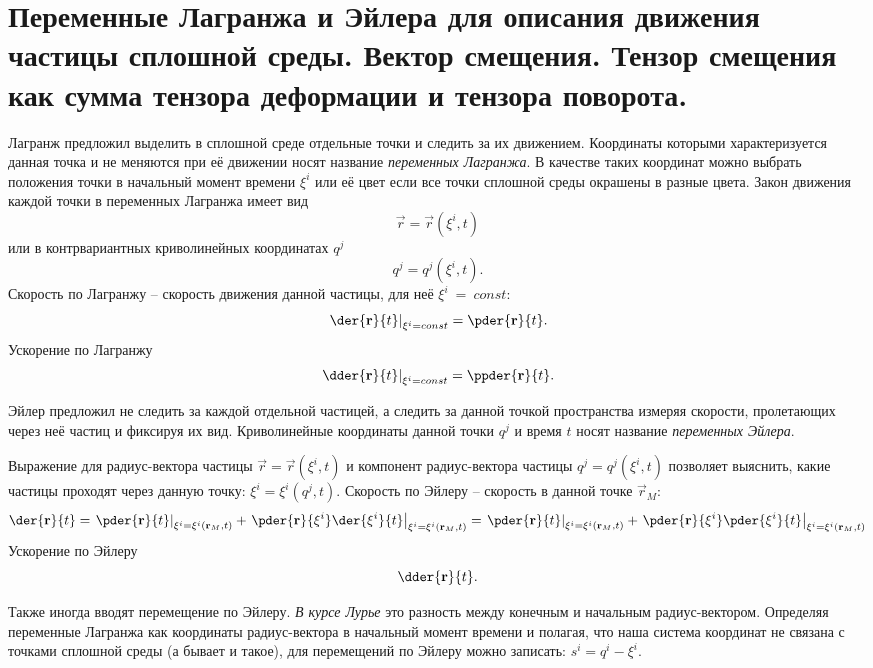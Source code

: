 \chapter{Переменные Лагранжа и Эйлера для описания движения частицы сплошной
среды. Вектор смещения. Тензор смещения как сумма тензора деформации и тензора
поворота.}

Лагранж предложил выделить в сплошной среде отдельные точки и следить за их
движением. Координаты которыми характеризуется данная точка и не меняются при
её движении носят название \emph{переменных Лагранжа}. В качестве таких
координат можно выбрать положения точки в начальный момент времени \( \xi^i \)
или её цвет если все точки сплошной среды окрашены в разные цвета.
Закон движения каждой точки в переменных Лагранжа имеет вид
\[
    \vec{r} = \vec{r}(\xi^i, t)
\] 
или в контрвариантных криволинейных координатах \( q^j \)
\[
    q^j = q^j(\xi^i, t).
\]
Скорость по Лагранжу -- скорость движения данной частицы, для неё
\( \xi^i~=~const \):
\[
    \left.\der{\vec{r}}{t}\right|_{\xi^i = const} = \pder{\vec{r}}{t}.
\]
Ускорение по Лагранжу   
\[
    \left.\dder{\vec{r}}{t}\right|_{\xi^i = const} = \ppder{\vec{r}}{t}.
\]
        
Эйлер предложил не следить за каждой отдельной частицей, а следить за данной
точкой пространства измеряя скорости, пролетающих через неё частиц и фиксируя
их вид. Криволинейные координаты данной точки \( q^j \)  и время \( t \) носят
название \emph{переменных Эйлера}.

Выражение для радиус-вектора частицы \( \vec{r} = \vec{r}(\xi^i, t) \) и
компонент радиус-вектора частицы \( q^j = q^j (\xi^i, t) \) позволяет выяснить,
какие частицы проходят через данную точку: \( \xi^i = \xi^i(q^j, t) \).
Скорость по Эйлеру -- скорость в данной точке \( \vec{r}_{M} \):
\[
    \der{\vec{r}}{t} = 
    \left.\pder{\vec{r}}{t}\right|_{\xi^i = \xi^i(\vec{r}_{M}, t)} +
    \left.\pder{\vec{r}}{\xi^i}
    \der{\xi^i}{t}\right|_{\xi^i = \xi^i(\vec{r}_{M}, t)} =
    \left.\pder{\vec{r}}{t}\right|_{\xi^i = \xi^i(\vec{r}_{M}, t)} +
    \left.\pder{\vec{r}}{\xi^i}
    \pder{\xi^i}{t}\right|_{\xi^i = \xi^i(\vec{r}_{M}, t)}
\]
Ускорение по Эйлеру
\[
    \dder{\vec{r}}{t}.
\]

Также иногда вводят перемещение по Эйлеру. \emph{В курсе Лурье} это разность
между конечным и начальным радиус-вектором. Определяя переменные Лагранжа как
координаты радиус-вектора в начальный момент времени и полагая, что наша
система координат не связана с точками сплошной среды (а бывает и такое), для
перемещений по Эйлеру можно записать: \( s^i = q^i - \xi^i \).
    

